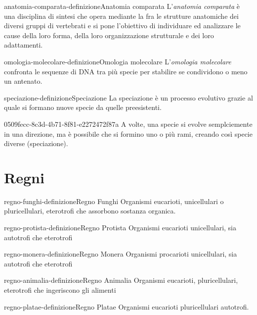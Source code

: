 \documentclass[preview]{standalone}
\begin{document}
\begin{snippetdefinition}{anatomia-comparata-definizione}{Anatomia comparata}
    L'\textit{anatomia comparata} è una disciplina di sintesi che 
    opera mediante la  fra le strutture anatomiche
    dei diversi gruppi di vertebrati e si pone l'obiettivo di individuare ed analizzare
    le cause della loro forma, della loro organizzazione strutturale e dei loro adattamenti.
\end{snippetdefinition}

\begin{snippetdefinition}{omologia-molecolare-definizione}{Omologia molecolare}
    L'\textit{omologia molecolare} confronta le sequenze di DNA
    tra più specie per stabilire se condividono o meno un antenato.
\end{snippetdefinition}


\begin{snippetdefinition}{speciazione-definizione}{Speciazione}
    La speciazione è un processo evolutivo grazie al quale si formano nuove specie da quelle preesistenti. 
\end{snippetdefinition}

\begin{snippet}{0509fecc-8c3d-4b71-8f81-e2272472f87a}
    A volte, una specie si evolve semplciemente in una direzione, ma è possibile che si formino
    uno o più rami, creando così specie diverse (speciazione).
\end{snippet}


\section{Regni}

\begin{snippetdefinition}{regno-funghi-definizione}{Regno Funghi}
    Organismi eucarioti, unicellulari o pluricellulari, eterotrofi
    che assorbono sostanza organica.
\end{snippetdefinition}

\begin{snippetdefinition}{regno-protista-definizione}{Regno Protista}
    Organismi eucarioti unicellulari, sia autotrofi
    che eterotrofi
\end{snippetdefinition}

\begin{snippetdefinition}{regno-monera-definizione}{Regno Monera}
    Organismi procarioti
    unicellulari, sia autotrofi che eterotrofi
\end{snippetdefinition}

\begin{snippetdefinition}{regno-animalia-definizione}{Regno Animalia}
    Organismi eucarioti, pluricellulari, eterotrofi
    che ingeriscono gli alimenti
\end{snippetdefinition}

\begin{snippetdefinition}{regno-platae-definizione}{Regno Platae}
    Organismi eucarioti pluricellulari autotrofi.
\end{snippetdefinition}
\end{document}
